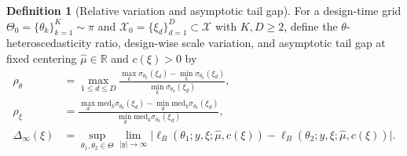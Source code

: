 \documentclass[11pt,a4paper,reqno]{amsart}
\theoremstyle{definition}
\newtheorem{definition}[theorem]{Definition}
\theoremstyle{remark}
\newcommand{\R}{\mathbb{R}}
\newcommand{\Xcal}{\mathcal{X}}
\begin{document}
\begin{definition}[Relative variation and asymptotic tail gap]\label{def:variations}
For a design-time grid $\Theta_0 = \{\theta_k\}_{k=1}^K \sim \pi$ and $\Xcal_0 = \{\xi_d\}_{d=1}^D \subset \Xcal$ with $K, D \ge 2$, define the $\theta$-heteroscedasticity ratio, design-wise scale variation, and asymptotic tail gap at fixed centering $\hat{\mu} \in \R$ and $c(\xi) > 0$ by
\begin{align*}
\rho_\theta &= \max_{1 \le d \le D} \frac{\max_k \sigma_{\theta_k}(\xi_d) - \min_k \sigma_{\theta_k}(\xi_d)}{\min_k \sigma_{\theta_k}(\xi_d)}, \\
\rho_\xi &= \frac{\max_d \mathrm{med}_k \sigma_{\theta_k}(\xi_d) - \min_d \mathrm{med}_k \sigma_{\theta_k}(\xi_d)}{\min_d \mathrm{med}_k \sigma_{\theta_k}(\xi_d)}, \\
\Delta_\infty(\xi) &= \sup_{\theta_1, \theta_2 \in \Theta} \lim_{|y| \to \infty} \bigl|\ell_B(\theta_1; y, \xi; \hat{\mu}, c(\xi)) - \ell_B(\theta_2; y, \xi; \hat{\mu}, c(\xi))\bigr|.
\end{align*}
\end{definition}
\end{document}
